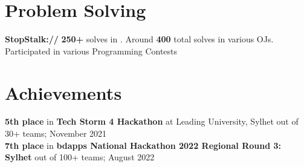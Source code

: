 \documentclass[]{deedy-resume-openfont}
\begin{document}
\begin{minipage}[t]{0.4\textwidth}

\section{Problem Solving}
\linesep
\small\textbf{StopStalk:// }
\vspace{2pt}
\small \textbullet{} \textbf{250+} solves in \href{https://codeforces.com/profile/navid_hasan}{}.
\hspace{-5pt}\textbullet{} Around \textbf{400} total solves in various OJs.\\
\textbullet{} Participated in various Programming Contests
\sectionsep


\section{Achievements}
\linesep
\textbullet\textbf{5th place} in \textbf{Tech Storm 4 Hackathon} at Leading University, Sylhet out of 30+ teams; November 2021\\
\vspace{3pt}
\textbullet\textbf{7th place} in \textbf{bdapps National Hackathon 2022 Regional Round 3: Sylhet} out of 100+ teams; August 2022\\
\sectionsep



\end{minipage}
\end{document}
